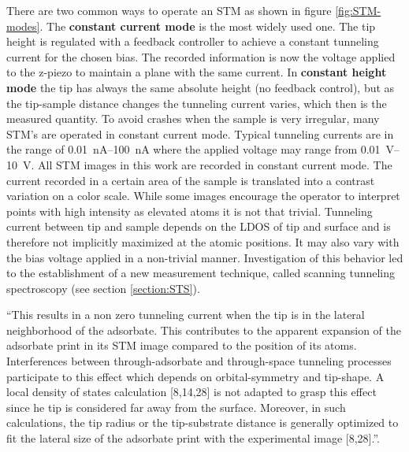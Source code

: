 There are two common ways to operate an STM as shown in figure \ref{fig:STM-modes}.
The \textbf{constant current mode} is the most widely used one. The tip height is regulated with a feedback controller to achieve a constant tunneling current for the chosen bias. The recorded information is now the voltage applied to the z-piezo to maintain a plane with the same current.
In \textbf{constant height mode} the tip has always the same absolute height (no feedback control), but as the tip-sample distance changes the tunneling current varies, which then is the measured quantity.
To avoid crashes when the sample is very irregular, many STM's are operated in constant current mode. Typical tunneling currents are in the range of \SIrange{0.01}{100}{\nA} where the applied voltage may range from \SIrange{0.01}{10}{\volt}. All STM images in this work are recorded in constant current mode.
The current recorded in a certain area of the sample is translated into a contrast variation on a color scale. While some images encourage the operator to interpret points with high intensity as elevated atoms it is not that trivial. Tunneling current between tip and sample depends on the LDOS of tip and surface and is therefore not implicitly maximized at the atomic positions. It may also vary with the bias voltage applied in a non-trivial manner. Investigation of this behavior led to the establishment of a new measurement technique, called scanning tunneling spectroscopy (see section \ref{section:STS}). 

``This results in a non zero tunneling current when the tip is in the lateral neighborhood of the adsorbate. This contributes to the apparent expansion of the adsorbate print in its STM image compared to the position of its atoms. Interferences between through-adsorbate and through-space tunneling processes participate to this effect which depends on orbital-symmetry and tip-shape. A local density of states calculation [8,14,28] is not adapted to grasp this effect since he tip is considered far away from the surface. Moreover, in such calculations, the tip radius or the tip-substrate distance is generally optimized to fit the lateral size of the adsorbate print with the experimental image [8,28].''\cite{sautet_interpretation_1992}.

